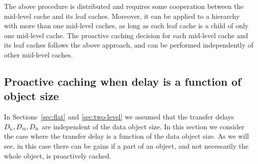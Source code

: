 \documentclass[conference]{IEEEtran}
\newcommand{\mynote}[1]{{{\medskip
\footnotesize \em \noindent Note: #1}}\medskip}
\renewcommand{\mynote}[1]{}
\newcommand{\M}{\mbox{\tiny M}}
\newcommand{\Leaf}{\mbox{\tiny L}}
\newcommand{\R}{\mbox{\tiny R}}
\newcommand{\wifi}{\mbox{\tiny wifi}}
\newcommand{\bkhl}{\mbox{\tiny bkhl}}
\begin{document}
The above procedure is distributed and requires some cooperation between the mid-level cache and its leaf caches.
Moreover, it can be applied to a hierarchy with more than one mid-level caches, as long as each leaf cache is a child of only one mid-level cache. The proactive caching decision for each mid-level cache and its leaf caches follows the above approach, and can be performed independently of other mid-level caches.

\vspace{-0.09in}
\subsection{Proactive caching when delay is a function of object size}
\label{sec:utility}
\vspace{-0.03in}

\mynote{
\begin{itemize}
\item  Extension of this model to a two-level hierarchy is not straightforward.
\item Perhaps more important, a two-level hierarchy of this model may not correspond to a scenario of practical interest: In a hotspot/small cell topology, the bottleneck is the hotspot/small cell backhaul. To have two-levels, we would need to have a link that is between the WiFi/radio link and the backhaul which has rate $R_{\bkhl} < R_{\M} < R_{\wifi}$. In practical systems, such a link does not exist.
\item An alternative is to write the utility as a function of the average delay, $\mathcal{U}_s(\sum_l q^l_s \mathcal{D}_s(x^l_s))$. Indeed, one can argue that such a form is more natural. However, such a form makes the utility $U_s()$ a function of variables $x^l_s, l\in L$, each of which encounter  a different congestion price. This problem is similar to  multipath flow control optimization models. A disadvantage is that it leads to a more complex decision rule compared to (\ref{eq:decision2}).
\item Addition of this model is to make framework more complete. Evaluation results for which model will/can not be included.
\end{itemize}
}


In Sections~\ref{sec:flat} and \ref{sec:two-level} we assumed that the transfer delays $D_{\Leaf},D_{\M}, D_{\R}$  are independent of the data object size.
In this section we consider the case where the transfer delay is a function of the data object size. As we will see, in this case there can be gains if a part of an object, and not necessarily the whole object, is proactively cached.
\end{document}
